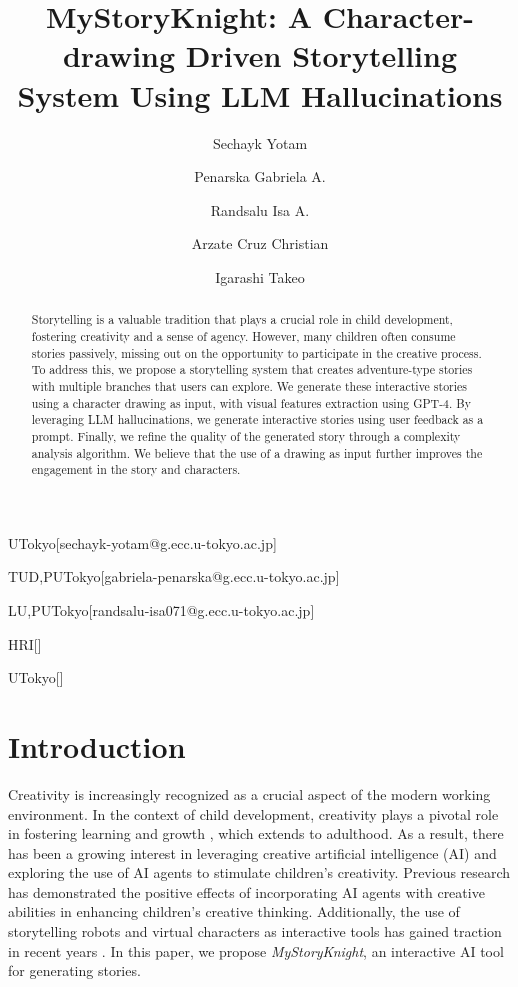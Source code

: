 \documentclass[submit,techrep,english]{ipsj}
\begin{document}
\title{MyStoryKnight: A Character-drawing Driven Storytelling System Using LLM Hallucinations}


\author{Sechayk Yotam}{UTokyo}[sechayk-yotam@g.ecc.u-tokyo.ac.jp]
\author{Penarska Gabriela A.}{TUD,PUTokyo}[gabriela-penarska@g.ecc.u-tokyo.ac.jp]
\author{Randsalu Isa A.}{LU,PUTokyo}[randsalu-isa071@g.ecc.u-tokyo.ac.jp]
\author{Arzate Cruz Christian}{HRI}[]
\author{Igarashi Takeo}{UTokyo}[]


\begin{abstract}
    Storytelling is a valuable tradition that plays a crucial role in child development, fostering creativity and a sense of agency. However, many children often consume stories passively, missing out on the opportunity to participate in the creative process. To address this, we propose a storytelling system that creates adventure-type stories with multiple branches that users can explore. We generate these interactive stories using a character drawing as input, with visual features extraction using GPT-4. By leveraging LLM hallucinations, we generate interactive stories using user feedback as a prompt. Finally, we refine the quality of the generated story through a complexity analysis algorithm. We believe that the use of a drawing as input further improves the engagement in the story and characters.
\end{abstract}

\maketitle

\section{Introduction}
\label{sec:introduction}
Creativity is increasingly recognized as a crucial aspect of the modern working environment. In the context of child development, creativity plays a pivotal role in fostering learning and growth \cite{1:ElgarfP22}, which extends to adulthood. As a result, there has been a growing interest in leveraging creative artificial intelligence (AI) and exploring the use of AI agents to stimulate children's creativity. Previous research has demonstrated the positive effects of incorporating AI agents with creative abilities in enhancing children's creative thinking. Additionally, the use of storytelling robots and virtual characters as interactive tools has gained traction in recent years \cite{7:SunLLL17}. In this paper, we propose \textit{MyStoryKnight}, an interactive AI tool for generating stories.
\end{document}
